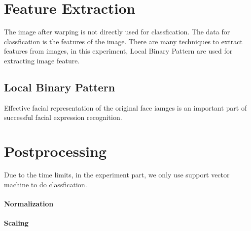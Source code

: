 \section{Feature Extraction}
The image after warping is not directly used for classfication. The data for classfication is the features of the image. There are many techniques to extract features from images, in this experiment, Local Binary Pattern are used for extracting image feature.
\subsection{Local Binary Pattern}
Effective facial representation of the original face iamges is an important part of successful facial expression recognition.
\section{Postprocessing}
Due to the time limits, in the experiment part, we only use support vector machine to do classfication.
\paragraph{Normalization}

\paragraph{Scaling}